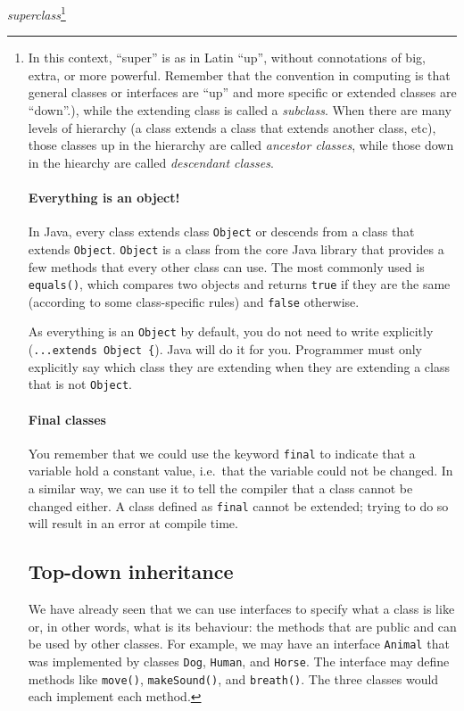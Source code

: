 \emph{superclass}\footnote{In this context, ``super'' is as in Latin
  ``up'', without connotations of big, extra, or more
  powerful. Remember that the convention in computing is that general
  classes or interfaces are ``up'' and more specific or extended classes
  are ``down''.), 
while the extending class is called a \emph{subclass}. When there are
many levels of hierarchy (a class extends a class that extends another
class, etc), those classes up in the hierarchy are called
\emph{ancestor classes}, while those down in the hiearchy are called
\emph{descendant classes}. 

\paragraph{Everything is an object!}
\label{sec:everything-an-object}

In Java, every class extends class \verb+Object+ or descends from a
class that extends \verb+Object+. \verb+Object+ is a class from the
core Java library that provides a few methods that every other class
can use. The most commonly used is \verb+equals()+, which compares two
objects and returns \verb+true+ if they are the same (according to
some class-specific rules) and \verb+false+ otherwise. 

As everything is an \verb+Object+ by default, you do not need to write
explicitly (\verb+...extends Object {+). Java will do it for
you. Programmer must only explicitly say which class they are
extending when they are extending a class that is not \verb+Object+.

\paragraph{Final classes}
\label{sec:final-classes}

You remember that we could use the keyword \verb+final+ to indicate
that a variable hold a constant value, i.e.~that the variable could
not be changed. In a similar way, we can use it to tell the compiler
that a class cannot be changed either. A class defined as \verb+final+
cannot be extended; trying to do so will result in an error at compile
time. 


\subsection{Top-down inheritance}
\label{sec:top-down-inheritance}

We have already seen that we can use interfaces to specify what a
class is like or, in other words, what is its behaviour: the methods
that are public and can be used by other classes. For example, we may
have an interface \verb+Animal+ that was implemented by classes
\verb+Dog+, \verb+Human+, and \verb+Horse+. The interface may define
methods like \verb+move()+, \verb+makeSound()+, and
\verb+breath()+. The three classes would each implement each method. 

}
